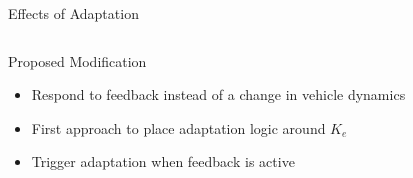 \documentclass[10pt]{beamer}
\begin{document}
\begin{frame}[fragile]{Effects of Adaptation}
  \begin{columns}[T]
    \begin{column}{\textwidth}
    \end{column}
  \end{columns}
\end{frame}

\begin{frame}[fragile]{Proposed Modification}
  \begin{itemize}
    \setlength\itemsep{1em}
    \item Respond to feedback instead of a change in vehicle dynamics
    \item First approach to place adaptation logic around $K_e$
    \item Trigger adaptation when feedback is active
  \end{itemize}
\end{frame}
\end{document}
